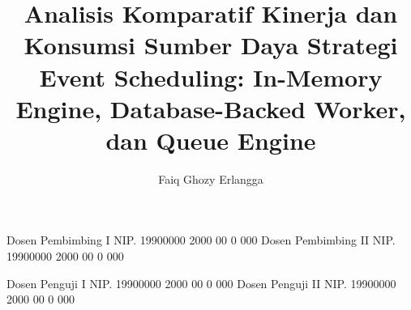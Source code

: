 \documentclass[article]{report} %
\begin{document}
    
    \title{Analisis Komparatif Kinerja dan Konsumsi Sumber Daya Strategi Event Scheduling: In-Memory Engine, Database-Backed Worker, dan Queue Engine}
    
	\author{Faiq Ghozy Erlangga}		%
	
	\dosbingA%
		{Dosen Pembimbing I}%
		{NIP. 19900000 2000 00 0 000}	%
	\dosbingB%
		{Dosen Pembimbing II}%
		{NIP. 19900000 2000 00 0 000}	%
		
	\pengujiA%
		{Dosen Penguji I}%
		{NIP. 19900000 2000 00 0 000}	%
	\pengujiB%
		{Dosen Penguji II}%
		{NIP. 19900000 2000 00 0 000}	%

	\sloppy %
    \setcounter{page}{1} %
\end{document}
